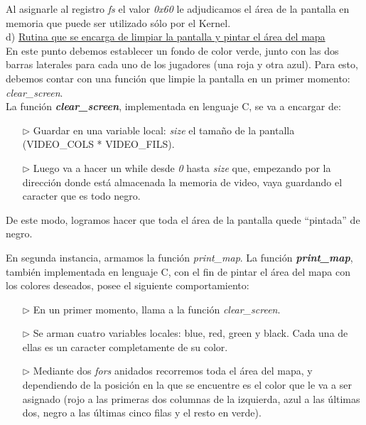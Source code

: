 \documentclass[a4paper]{article}
\begin{document}
Al asignarle al registro \emph{fs} el valor \emph{0x60} le adjudicamos el área de la pantalla en memoria que puede ser utilizado sólo por el Kernel.\\



{\large d)} \underline{Rutina que se encarga de limpiar la pantalla y pintar el \'area del mapa}
\\

En este punto debemos establecer un fondo de color verde, junto con las dos barras laterales para cada uno de los jugadores (una roja y otra azul). Para esto, debemos contar con una funci\'on que limpie la pantalla en un primer momento: \emph{clear_screen}.\\

La funci\'on \textbf{\textit{clear_screen}}, implementada en lenguaje C, se va a encargar de: 

\begin{itemize}
\item[$\triangleright$] Guardar en una variable local: \emph{size} el tama\~no de la pantalla (VIDEO_COLS * VIDEO_FILS).
\item[$\triangleright$] Luego va a hacer un while desde \emph{0} hasta \emph{size} que, empezando por la direcci\'on donde est\'a almacenada la memoria de video, vaya guardando el caracter que es todo negro.
\end{itemize}

De este  modo, logramos hacer que toda el \'area de la pantalla quede ``pintada'' de negro. \\

\bigskip

En segunda instancia, armamos la funci\'on \emph{print_map}. La funci\'on \textbf{\textit{print_map}}, tambi\'en implementada en lenguaje C, con el fin de pintar el \'area del mapa con los colores deseados, posee el siguiente comportamiento:

\begin{itemize}
\item[$\triangleright$] En un primer momento, llama a la funci\'on \emph{clear_screen}.
\item[$\triangleright$] Se arman cuatro variables locales: blue, red, green y black. Cada una de ellas es un caracter completamente de su color.
\item[$\triangleright$] Mediante dos \textit{fors} anidados recorremos toda el \'area del mapa, y dependiendo de la posici\'on en la que se encuentre es el color que le va a ser asignado (rojo a las primeras dos columnas de la izquierda, azul a las \'ultimas dos, negro a las \'ultimas cinco filas y el resto en verde).
\end{itemize}
\end{document}

